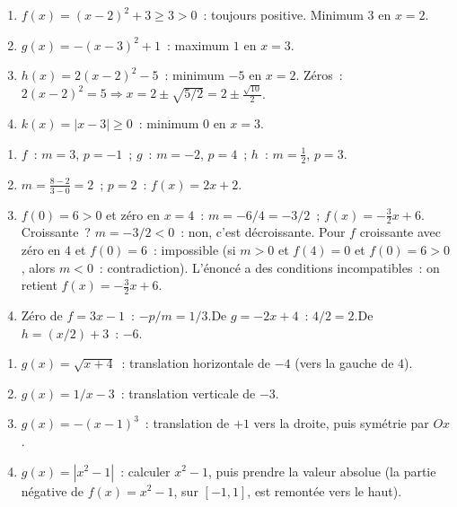
\begin{enumerate}
  \item $f(x)=(x-2)^2+3\geq3>0$~: toujours positive. Minimum $3$ en $x=2$.
  \item $g(x)=-(x-3)^2+1$~: maximum $1$ en $x=3$.
  \item $h(x)=2(x-2)^2-5$~: minimum $-5$ en $x=2$.
        Z\'eros~: $2(x-2)^2=5\Rightarrow x=2\pm\sqrt{5/2}=2\pm\frac{\sqrt{10}}{2}$.
  \item $k(x)=|x-3|\geq0$~: minimum $0$ en $x=3$.
\end{enumerate}


\begin{enumerate}
  \item $f$~: $m=3$, $p=-1$~; $g$~: $m=-2$, $p=4$~; $h$~: $m=\frac{1}{2}$, $p=3$.
  \item $m=\frac{8-2}{3-0}=2$~; $p=2$~: $f(x)=2x+2$.
  \item $f(0)=6>0$ et z\'ero en $x=4$~: $m=-6/4=-3/2$~; $f(x)=-\frac{3}{2}x+6$.
        Croissante~? $m=-3/2<0$~: non, c'est d\'ecroissante.
        Pour $f$ croissante avec z\'ero en $4$ et $f(0)=6$~: impossible (si $m>0$ et $f(4)=0$ et $f(0)=6>0$,
        alors $m<0$~: contradiction). L'\'enonc\'e a des conditions incompatibles~: on retient $f(x)=-\frac{3}{2}x+6$.
  \item Z\'ero de $f=3x-1$~: $-p/m=1/3$.\checkmark\quad De $g=-2x+4$~: $4/2=2$.\checkmark\quad De $h=(x/2)+3$~: $-6$.
\end{enumerate}


\begin{enumerate}
  \item $g(x)=\sqrt{x+4}$~: translation horizontale de $-4$ (vers la gauche de $4$).
  \item $g(x)=1/x-3$~: translation verticale de $-3$.
  \item $g(x)=-(x-1)^3$~: translation de $+1$ vers la droite, puis sym\'etrie par $Ox$.
  \item $g(x)=|x^2-1|$~: calculer $x^2-1$, puis prendre la valeur absolue
        (la partie n\'egative de $f(x)=x^2-1$, sur $[-1,1]$, est remont\'ee vers le haut).
\end{enumerate}

